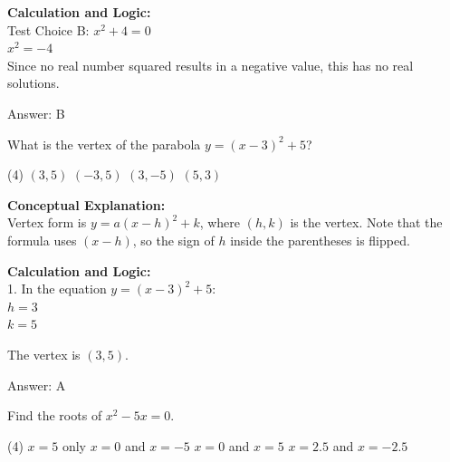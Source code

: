 \documentclass[11pt,paper=a4,answers]{exam}
\begin{document}
\begin{questions}
\begin{solution}
\textbf{Calculation and Logic:} \\
Test Choice B: $x^2 + 4 = 0$ \\
$x^2 = -4$ \\
Since no real number squared results in a negative value, this has no real solutions.

\vspace{20pt}

Answer: \colorbox{yellow!100}{B}
\end{solution}

\vspace{30pt}

\question
What is the vertex of the parabola $y = (x - 3)^2 + 5$?
\begin{tasks}(4)
    \task $(3, 5)$
    \task $(-3, 5)$
    \task $(3, -5)$
    \task $(5, 3)$
\end{tasks}

\begin{solution}
\textbf{Conceptual Explanation:} \\
Vertex form is $y = a(x - h)^2 + k$, where $(h, k)$ is the vertex. Note that the formula uses $(x - h)$, so the sign of $h$ inside the parentheses is flipped.

\vspace{15pt}

\textbf{Calculation and Logic:} \\
1. In the equation $y = (x - 3)^2 + 5$: \\
   $h = 3$ \\
   $k = 5$

\vspace{10pt}

The vertex is $(3, 5)$.

\vspace{20pt}

Answer: \colorbox{yellow!100}{A}
\end{solution}

\vspace{30pt}

\question
Find the roots of $x^2 - 5x = 0$.
\begin{tasks}(4)
    \task $x = 5$ only
    \task $x = 0$ and $x = -5$
    \task $x = 0$ and $x = 5$
    \task $x = 2.5$ and $x = -2.5$
\end{tasks}


\end{questions}
\end{document}
